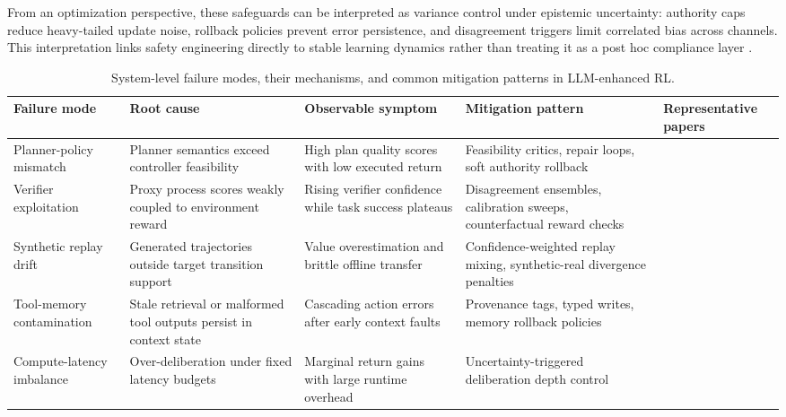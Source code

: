 ﻿\documentclass[conference]{IEEEtran}
\begin{document}
From an optimization perspective, these safeguards can be interpreted as variance control under epistemic uncertainty: authority caps reduce heavy-tailed update noise, rollback policies prevent error persistence, and disagreement triggers limit correlated bias across channels. This interpretation links safety engineering directly to stable learning dynamics rather than treating it as a post hoc compliance layer \cite{arxiv_p_2602_06493,arxiv_p_2602_12579,arxiv_p_2602_14468}.

\begin{table}[t]
\centering
\small
\setlength{\tabcolsep}{4pt}
\begin{tabularx}{\textwidth}{P{2.1cm}P{2.4cm}P{2.2cm}P{2.4cm}Y}
\toprule
\textbf{Failure mode} & \textbf{Root cause} & \textbf{Observable symptom} & \textbf{Mitigation pattern} & \textbf{Representative papers}\\
\midrule
Planner-policy mismatch & Planner semantics exceed controller feasibility & High plan quality scores with low executed return & Feasibility critics, repair loops, soft authority rollback & \cite{arxiv_p_2204_01691,arxiv_p_2405_01534,arxiv_p_2512_12716}\\
Verifier exploitation & Proxy process scores weakly coupled to environment reward & Rising verifier confidence while task success plateaus & Disagreement ensembles, calibration sweeps, counterfactual reward checks & \cite{arxiv_p_2602_06493,arxiv_p_2602_12579,arxiv_p_2602_02395}\\
Synthetic replay drift & Generated trajectories outside target transition support & Value overestimation and brittle offline transfer & Confidence-weighted replay mixing, synthetic-real divergence penalties & \cite{arxiv_p_2602_02454,arxiv_p_2602_11075,arxiv_p_2601_08107}\\
Tool-memory contamination & Stale retrieval or malformed tool outputs persist in context state & Cascading action errors after early context faults & Provenance tags, typed writes, memory rollback policies & \cite{arxiv_p_2404_03648,arxiv_p_2602_00994,arxiv_p_2601_07264}\\
Compute-latency imbalance & Over-deliberation under fixed latency budgets & Marginal return gains with large runtime overhead & Uncertainty-triggered deliberation depth control & \cite{arxiv_p_2602_07848,arxiv_p_2602_14234,arxiv_p_2510_06727}\\
\bottomrule
\end{tabularx}
\caption{System-level failure modes, their mechanisms, and common mitigation patterns in LLM-enhanced RL.}
\label{tab:t6_failure}
\end{table}
\end{document}
